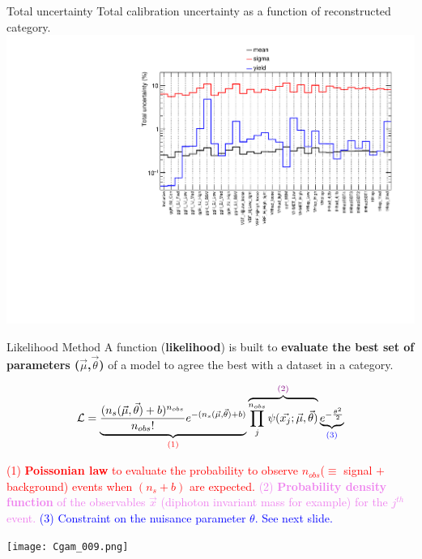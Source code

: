 \begin{frame}{Total uncertainty}
  \centering
  Total calibration uncertainty as a function of reconstructed category.\\
\includegraphics[width=0.9\linewidth]{Figures/h015d_FULLMerge_catMerge_Systematics_InclusiveUp.pdf}  
\end{frame}
\begin{frame}{Likelihood Method}
A function ({\bf likelihood}) is built to {\bf evaluate the best set of parameters ($\vec{\mu}$,$\vec{\theta}$)} of a model to agree the best with a dataset in a category.

$$\mathcal{L}=\underbrace{\frac{(n_{s}(\vec{\mu},\vec{\theta})+b)^{n_{obs}}}{n_{obs}!} e^{-(n_{s}(\vec{\mu},\vec{\theta})+b)}}_{\textcolor{red}{\text{(1)}}}  \overbrace{\prod_j^{n_{obs}}\psi(\vec{x_j};\vec{\mu},\vec{\theta})}^{\textcolor{violet}{\text{(2)}}} \underbrace{e^{-\frac{\theta^2}{2}}}_{\textcolor{blue}{\text{(3)}}}$$
\vfill
\begin{minipage}{0.49\linewidth}
\textcolor{red}{(1) {\bf Poissonian law} to evaluate the probability to observe $n_{obs}$($\equiv$ signal $+$ background) events when $(n_s+b)$ are expected.}\newline
\textcolor{violet}{(2) {\bf Probability density function} of the observables $\vec{x}$ (diphoton invariant mass for example) for the $j^{th}$ event.}\newline
\textcolor{blue}{(3) Constraint on the nuisance parameter $\theta$. See next slide.}\newline
\end{minipage}
\begin{minipage}{0.49\linewidth}
\texttt{[image: Cgam\_009.png]}
\end{minipage}
\end{frame}


